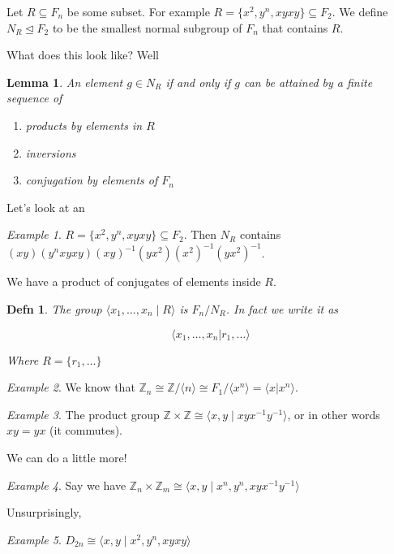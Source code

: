\documentclass[12pt]{article}
\def\Z{{\mathbb Z}}
\newcommand{\lr}[1]{\langle #1 \rangle}
\newtheorem{definition}{Defn}
\newtheorem{lemma}[theorem]{Lemma} %
\theoremstyle{remark}
\theoremstyle{remark}
\theoremstyle{remark}
\newtheorem{example}{Example}
\theoremstyle{remark}
\theoremstyle{remark}
\begin{document}
Let $R \subseteq F_n$ be some subset. For example $R = \{x^2, y^n, xyxy\}
\subseteq F_2$. We define $N_R \trianglelefteq F_2$ to be the smallest normal
subgroup of $F_n$ that contains $R$.

What does this look like? Well

\begin{lemma}
  An element $g \in N_R$ if and only if $g$ can be attained by a finite sequence
  of

  \begin{enumerate}
    \item products by elements in $R$
    \item inversions
    \item conjugation by elements of $F_n$
  \end{enumerate}
\end{lemma}

Let's look at an

\begin{example}
  $R = \{x^2, y^n, xyxy \} \subseteq F_2$. Then $N_R$ contains $(xy)(y^n
  xyxy)(xy)^{-1}(yx^2) (x^2)^{-1}(yx^2)^{-1}$.

  We have a product of conjugates of elements inside $R$.
\end{example}

\begin{definition}
  The group $\lr {x_1, \dots, x_n \mid R }$ is $F_n / N_R$. In fact we write it
  as

  \[
    \lr {x_1, \dots, x_n | r_1, \dots }
  \]

  Where $R = \{r_1, \dots\}$
\end{definition}

\begin{example}
  We know that $\Z_n \cong \Z / \lr{n} \cong F_1 / \lr{x^n} = \lr{x | x^n}$.
\end{example}

\begin{example}
  The product group $\Z \times \Z \cong \lr {x, y \mid xyx^{-1}y^{-1}}$, or in
  other words $xy = yx$ (it commutes).
\end{example}

We can do a little more!

\begin{example}
  Say we have $\Z_n \times \Z_m \cong \lr{x, y \mid x^n, y^n, xyx^{-1}y^{-1} }$
\end{example}

Unsurprisingly,

\begin{example}
  $D_{2n} \cong \lr {x, y \mid x^2, y^n, xyxy }$
\end{example}
\end{document}
